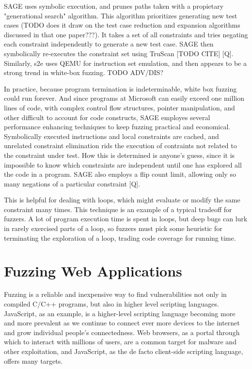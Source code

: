 \documentclass[11pt,expanded,copyright]{fsuthesis}
\begin{document}
SAGE uses symbolic execution, and prunes paths taken with a propietary "generational search" algorithm. This algorithm prioritizes generating new test cases (TODO does it draw on the test case reduction and expansion algorithms discussed in that one paper???). It takes a set of all constraints and tries negating each constraint independently to generate a new test case. SAGE then symbolically re-executes the constraint set using TruScan [TODO CITE] [Q]. Similarly, s2e uses QEMU for instruction set emulation, and then appears to be a strong trend in white-box fuzzing. TODO ADV/DIS?

In practice, because program termination is indeterminable, white box fuzzing could run forever. And since programs at Microsoft can easily exceed one million lines of code, with complex control flow structures, pointer manipulation, and other difficult to account for code constructs, SAGE employes several performance enhancing techniques to keep fuzzing practical and economical. Symbolically executed instructions and local constraints are cached, and unrelated constraint elimination rids the execution of contraints not related to the constraint under test. How this is determined is anyone's guess, since it is impossible to know which constraints are independent until one has explored all the code in a program. SAGE also employs a flip count limit, allowing only so many negations of a particular constraint [Q]. 

This is helpful for dealing with loops, which might evaluate or modify the same constraint many times. This technique is an example of a typical tradeoff for fuzzers. A lot of program execution time is spent in loops, but deep bugs can lurk in rarely exercised parts of a loop, so fuzzers must pick some heuristic for terminating the exploration of a loop, trading code coverage for running time.



\section{Fuzzing Web Applications}

Fuzzing is a reliable and inexpensive way to find vulnerabilities not only in compiled C/C++ programs, but also in higher level scripting languages. JavaScript, as an example, is a higher-level scripting language becoming more and more prevalent as we continue to connect ever more devices to the internet and grow individual people's connectedness. Web browsers, as a portal through which to interact with millions of users, are a common target for malware and other exploitation, and JavaScript, as the de facto client-side scripting language, offers many targets. 
\end{document}
